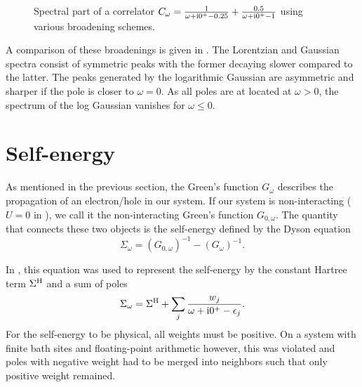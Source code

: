 \begin{figure}[ht]
    \centering
    
    \caption{
        Spectral part of a correlator
        $C_\omega = \frac{1}{\omega + \mathrm{i}0^+ - 0.25} + \frac{0.5}{\omega + \mathrm{i}0^+ - 1}$
        using various broadening schemes.
    }
    \label{fig:broadening}
\end{figure}

A comparison of these broadenings is given in .
The Lorentzian and Gaussian spectra consist of symmetric peaks
with the former decaying slower compared to the latter.
The peaks generated by the logarithmic Gaussian are asymmetric
and sharper if the pole is closer to $\omega=0$.
As all poles are at located at $\omega>0$,
the spectrum of the log Gaussian vanishes for $\omega\le0$.

\section{Self-energy}
\label{sec:self-energy}

As mentioned in the previous section,
the Green's function $G_\omega$ describes the propagation of an electron/hole in our system.
If our system is non-interacting ($U=0$ in ),
we call it the non-interacting Green's function $G_{0, \omega}$.
The quantity that connects these two objects is the self-energy defined by the Dyson equation
\begin{equation}
    \Sigma_\omega = (G_{0, \omega})^{-1} - (G_\omega)^{-1}.
    \label{eq:dyson}
\end{equation}

In \cite{Lu2014},
this equation was used to represent the self-energy by the constant Hartree term $\Sigma^{\mathrm{H}}$
and a sum of poles
\begin{equation}
    \Sigma_\omega = \Sigma^{\mathrm{H}} + \sum_j \frac{w_j}{\omega + \mathrm{i}0^+ - \epsilon_j}.
    \label{eq:self-energy-sum-of-poles}
\end{equation}
For the self-energy to be physical, all weights must be positive.
On a system with finite bath sites and floating-point arithmetic however,
this was violated and poles with negative weight had to be merged into neighbors
such that only positive weight remained.

